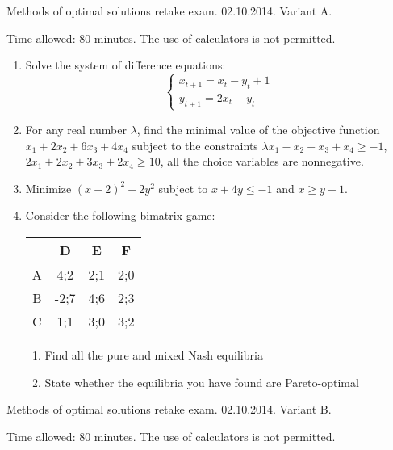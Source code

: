 \documentclass[12pt,a4paper]{article}
\begin{document}
Methods of optimal solutions retake exam. 02.10.2014. Variant A.

Time allowed: 80 minutes. The use of calculators is not permitted.

\begin{enumerate}

\item Solve the system of difference equations:
\[
\begin{cases}
x_{t+1}=x_t-y_t + 1\\
y_{t+1}=2x_t-y_t
\end{cases}
\]

\item For any real number $\lambda$, find the minimal value of the objective function $x_1+2x_2+6x_3+4x_4$ subject to the constraints  $\lambda x_1-x_2+x_3+x_4\geq -1$, $2x_1+2x_2+3x_3+2x_4 \geq 10$,  all the choice variables are nonnegative.


\item Minimize $(x-2)^2+2 y^2$ subject to $x+4y\leq -1$ and $x\geq y+1$.


\item   Consider the following bimatrix game:


\begin{tabular}{c|ccc}
 & D & E & F \\
\hline
A & 4;2 & 2;1 & 2;0  \\
B & -2;7 & 4;6 & 2;3  \\
C & 1;1 & 3;0 & 3;2  \\
\end{tabular}

\begin{enumerate}
\item Find all the pure and mixed Nash equilibria
\item State whether the equilibria you have found are Pareto-optimal
\end{enumerate}

\end{enumerate}


Methods of optimal solutions retake exam. 02.10.2014. Variant B.

Time allowed: 80 minutes. The use of calculators is not permitted.
\end{document}
